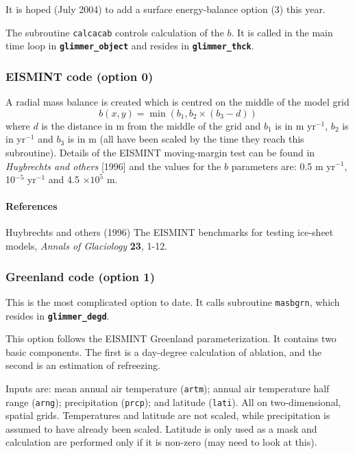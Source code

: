 It is hoped (July 2004) to add a surface energy-balance option (3)
this year.

The subroutine \texttt{calcacab} controls calculation of the $b$.
It is called in the main time loop in
\textbf{\texttt{glimmer\_object}} and resides in
\textbf{\texttt{glimmer\_thck}}.

\subsubsection{EISMINT code (option 0)}
A radial mass balance is created which is centred on the middle of
the model grid
\begin{equation}\label{eismintb}
    b(x,y) = \min(b_1,b_2\times(b_3-d))
\end{equation}
where $d$ is the distance in m from the middle of the grid and
$b_1$ is in m yr$^{-1}$, $b_2$ is in yr$^{-1}$ and $b_3$ is in m
(all have been scaled by the time they reach this subroutine).
Details of the EISMINT moving-margin test can be found in
\emph{Huybrechts and others} [1996] and the values for the $b$
parameters are: 0.5 m yr$^{-1}$, 10$^{-5}$ yr$^{-1}$ and 4.5
$\times 10^5$ m.

\paragraph{References}

Huybrechts and others (1996) The EISMINT benchmarks for testing
ice-sheet models, \emph{Annals of Glaciology} \textbf{23}, 1-12.

\subsubsection{Greenland code (option 1)}
This is the most complicated option to date.  It calls subroutine
\texttt{masbgrn}, which resides in
\textbf{\texttt{glimmer\_degd}}.

This option follows the EISMINT Greenland parameterization.  It
contains two basic components.  The first is a day-degree
calculation of ablation, and the second is an estimation of
refreezing.

Inputs are: mean annual air temperature (\texttt{artm}); annual
air temperature half range (\texttt{arng}); precipitation
(\texttt{prcp}); and latitude (\texttt{lati}).  All on
two-dimensional, spatial grids. Temperatures and latitude are not
scaled, while precipitation is assumed to have already been
scaled.  Latitude is only used as a mask and calculation are
performed only if it is non-zero (may need to look at this).

